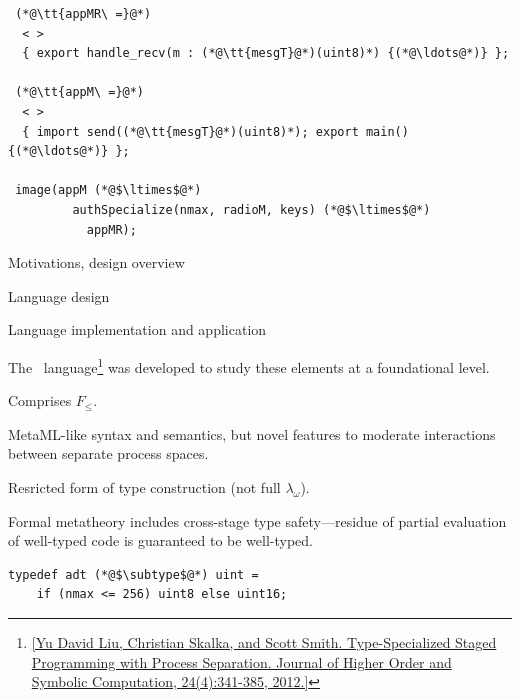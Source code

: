 
\begin{lstlisting}
 (*@\tt{appMR\ =}@*) 
  < >
  { export handle_recv(m : (*@\tt{mesgT}@*)(uint8)*) {(*@\ldots@*)} }; 

 (*@\tt{appM\ =}@*) 
  < >
  { import send((*@\tt{mesgT}@*)(uint8)*); export main() {(*@\ldots@*)} };  

 image(appM (*@$\ltimes$@*)
         authSpecialize(nmax, radioM, keys) (*@$\ltimes$@*)
           appMR);
\end{lstlisting}
\stopslide


\begin{cenumerate}
\item Motivations, design overview
\item {}
\begin{citemize}
\item Language design 
\item {}
\end{citemize}
\item Language implementation and application
\end{cenumerate}
\stopslide


 The \fml\ language\footnote{\cref{Yu David Liu, Christian Skalka,
    and Scott Smith. Type-Specialized Staged Programming with Process Separation. Journal of
    Higher Order and Symbolic Computation, 24(4):341-385, 2012.}} was developed to study these
elements at a foundational level.
\begin{citemize}
\item Comprises $F_{\le}$.
\item MetaML-like syntax and semantics, but novel features to moderate interactions between
  separate process spaces.
\item Resricted form of type construction (not full $\lambda_\omega$).
\item Formal metatheory includes cross-stage type safety---residue of partial evaluation of
  well-typed code is guaranteed to be well-typed.
\end{citemize}
\stopslide


\begin{center}
\begin{lstlisting}
typedef adt (*@$\subtype$@*) uint =
    if (nmax <= 256) uint8 else uint16;
\end{lstlisting}
\end{center}


